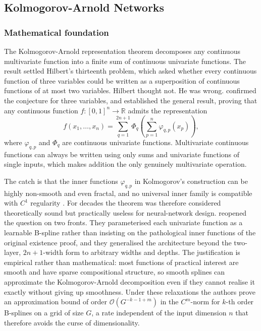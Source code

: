 \documentclass[12pt,a4paper,oneside]{article}
\begin{document}
\subsection{Kolmogorov-Arnold Networks}\label{subsec:lit_kan}

\subsubsection{Mathematical foundation}\label{subsubsec:kan_math}

The Kolmogorov-Arnold representation theorem decomposes any continuous multivariate function into a finite sum of continuous univariate functions. The result settled Hilbert's thirteenth problem, which asked whether every continuous function of three variables could be written as a superposition of continuous functions of at most two variables. Hilbert thought not. He was wrong. \citet{arnold_1958} confirmed the conjecture for three variables, and \citet{kolmogorov_1957} established the general result, proving that any continuous function $f : [0,1]^n \to \mathbb{R}$ admits the representation
\begin{equation}
f(x_1, \ldots, x_n) = \sum_{q=1}^{2n+1} \Phi_q \! \left( \sum_{p=1}^{n} \varphi_{q,p}(x_p) \right),
\label{eq:kst}
\end{equation}
where $\varphi_{q,p}$ and $\Phi_q$ are continuous univariate functions. Multivariate continuous functions can always be written using only sums and univariate functions of single inputs, which makes addition the only genuinely multivariate operation.

The catch is that the inner functions $\varphi_{q,p}$ in Kolmogorov's construction can be highly non-smooth and even fractal, and no universal inner family is compatible with $C^1$ regularity \citep{liu_kan_2024}. For decades the theorem was therefore considered theoretically sound but practically useless for neural-network design. \citet{liu_kan_2024} reopened the question on two fronts. They parameterised each univariate function as a learnable B-spline rather than insisting on the pathological inner functions of the original existence proof, and they generalised the architecture beyond the two-layer, $2n+1$-width form to arbitrary widths and depths. The justification is empirical rather than mathematical: most functions of practical interest are smooth and have sparse compositional structure, so smooth splines can approximate the Kolmogorov-Arnold decomposition even if they cannot realise it exactly without giving up smoothness. Under these relaxations the authors prove an approximation bound of order $\mathcal{O}(G^{-k-1+m})$ in the $C^m$-norm for $k$-th order B-splines on a grid of size $G$, a rate independent of the input dimension $n$ that therefore avoids the curse of dimensionality.
\end{document}
